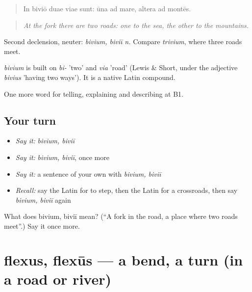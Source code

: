 \begin{quote}
In biviō duae viae sunt: ūna ad mare, altera ad montēs.
\end{quote}

\begin{quote}
\emph{At the fork there are two roads: one to the sea, the other to the mountains.}
\end{quote}

Second declension, neuter: \emph{bivium, biviī n.} Compare \emph{trivium}, where three roads meet.

\begin{cousinweb}
\emph{bivium} is built on \emph{bi-} 'two' and \emph{via} 'road' (Lewis \& Short, under the adjective \emph{bivius} 'having two ways'). It is a native Latin compound.
\end{cousinweb}

\begin{grammarlens}[title={What you've built}]
One more word for telling, explaining and describing at B1.
\end{grammarlens}

\subsection*{Your turn}
\begin{itemize}
\raggedright
  \item \emph{Say it:} \emph{bivium, biviī}
  \item \emph{Say it:} \emph{bivium, biviī}, once more
  \item \emph{Say it:} a sentence of your own with \emph{bivium, biviī}
  \item \emph{Recall:} say the Latin for to step, then the Latin for a crossroads, then say \emph{bivium, biviī} again
\end{itemize}

\begin{tcolorbox}[breakable,colback=teal!4,colframe=teal!35!black,title={Before you move on}]
What does bivium, biviī mean? (\textquotedblleft{}A fork in the road, a place where two roads meet\textquotedblright{}.) Say it once more.
\end{tcolorbox}
\section[flexus, flexūs]{flexus, flexūs — a bend, a turn (in a road or river)}

\label{lesson:LA-C424-flexus}



